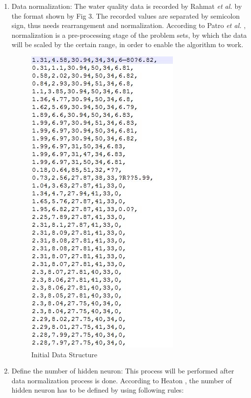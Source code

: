 \documentclass[journal,comsoc]{IEEEtran}
\let\MYoriglatexcaption\caption
\renewcommand{\caption}[2][\relax]{\MYoriglatexcaption[#2]{#2}}
\begin{document}
\begin{enumerate}

\item Data normalization: The water quality data is recorded by Rahmat {\it et al.} \cite{Rahmat16} by the format shown by Fig 3. The recorded values are separated by semicolon sign, thus needs rearrangement and normalization. According to Patro {\it et al.} \cite{Patro15} , normalization is a pre-processing stage of the problem sets, by which the data will be scaled by the certain range, in order to enable the algorithm to work.

\begin{figure}[!th]
\centering
\includegraphics[scale=0.2]{fig-3.jpg}
\caption{Initial Data Structure\cite{Rahmat16}}
\label{fig3}
\end{figure}

\item Define the number of hidden neuron: This process will be performed after data normalization process is done. According to Heaton \cite{Heaton08} , the number of hidden neuron has to be defined by using following rules:


\end{enumerate}
\end{document}
